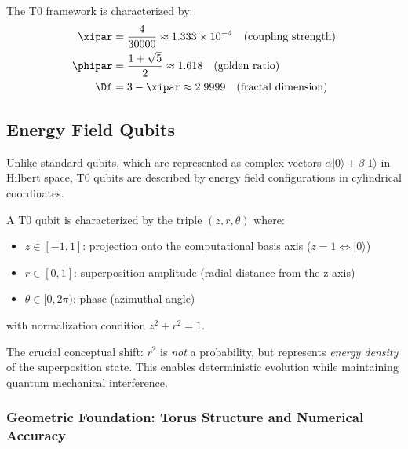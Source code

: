 \begin{definition}
	The T0 framework is characterized by:
	\begin{align}
		\xipar &= \frac{4}{30000} \approx 1.333 \times 10^{-4} \quad \text{(coupling strength)} \\
		\phipar &= \frac{1 + \sqrt{5}}{2} \approx 1.618 \quad \text{(golden ratio)} \\
		\Df &= 3 - \xipar \approx 2.9999 \quad \text{(fractal dimension)}
	\end{align}
\end{definition}

\subsection{Energy Field Qubits}

Unlike standard qubits, which are represented as complex vectors $\alpha|0\rangle + \beta|1\rangle$ in Hilbert space, T0 qubits are described by energy field configurations in cylindrical coordinates.

\begin{definition}[T0 Qubit]
	A T0 qubit is characterized by the triple $(z, r, \theta)$ where:
	\begin{itemize}
		\item $z \in [-1, 1]$: projection onto the computational basis axis ($z=1 \Leftrightarrow |0\rangle$)
		\item $r \in [0, 1]$: superposition amplitude (radial distance from the z-axis)
		\item $\theta \in [0, 2\pi)$: phase (azimuthal angle)
	\end{itemize}
	with normalization condition $z^2 + r^2 = 1$.
\end{definition}

\begin{remark}
	The crucial conceptual shift: $r^2$ is \emph{not} a probability, but represents \emph{energy density} of the superposition state. This enables deterministic evolution while maintaining quantum mechanical interference.
\end{remark}

\subsubsection{Geometric Foundation: Torus Structure and Numerical Accuracy}
\label{sec:torus_geometry_corrected}

